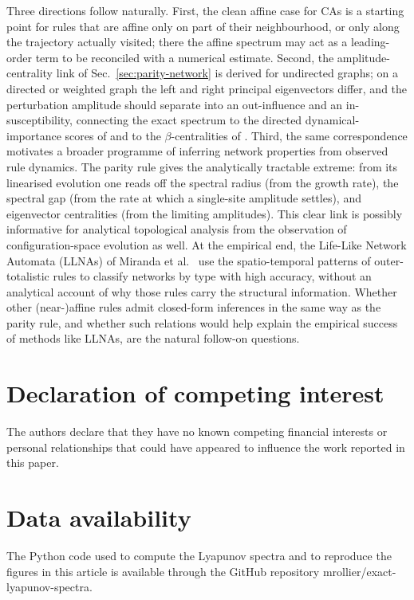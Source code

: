 \documentclass[a4paper,fleqn]{cas-dc}
\begin{document}
Three directions follow naturally. First, the clean affine case for CAs is a starting point for rules that are affine only on part of their neighbourhood, or only along the trajectory actually visited; there the affine spectrum may act as a leading-order term to be reconciled with a numerical estimate. Second, the amplitude-centrality link of Sec.~\ref{sec:parity-network} is derived for undirected graphs; on a directed or weighted graph the left and right principal eigenvectors differ, and the perturbation amplitude should separate into an out-influence and an in-susceptibility, connecting the exact spectrum to the directed dynamical-importance scores of \cite{restrepo2006characterizing} and to the $\beta$-centralities of \cite{bonacich1987power}. Third, the same correspondence motivates a broader programme of inferring network properties from observed rule dynamics. The parity rule gives the analytically tractable extreme: from its linearised evolution one reads off the spectral radius (from the growth rate), the spectral gap (from the rate at which a single-site amplitude settles), and eigenvector centralities (from the limiting amplitudes). This clear link is possibly informative for analytical topological analysis from the observation of configuration-space evolution as well. At the empirical end, the Life-Like Network Automata (LLNAs) of Miranda et al.~\cite{miranda2016exploring,rollier2025essential} use the spatio-temporal patterns of outer-totalistic rules to classify networks by type with high accuracy, without an analytical account of why those rules carry the structural information. Whether other (near-)affine rules admit closed-form inferences in the same way as the parity rule, and whether such relations would help explain the empirical success of methods like LLNAs, are the natural follow-on questions.

\section*{Declaration of competing interest}
The authors declare that they have no known competing financial interests or personal relationships that could have appeared to influence the work reported in this paper.

\section*{Data availability}
The Python code used to compute the Lyapunov spectra and to reproduce the figures in this article is available through the GitHub repository mrollier/exact-lyapunov-spectra.
\end{document}
